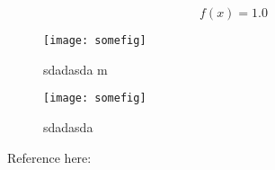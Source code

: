 \documentclass{memoir}
\begin{document}
\begin{equation}
  f(x) = 1.0
  \label{eq:eq1}
\end{equation}

\begin{figure}[tbp]
  \centering
  \texttt{[image: somefig]}
  \caption{sdadasda \si{\m}}
  \label{fig:fig1}
\end{figure}

\begin{figure}[tbp]
  \centering
  \texttt{[image: somefig]}
  \caption{sdadasda}
  \label{fig:fig2}
\end{figure}

Reference here:
\end{document}
